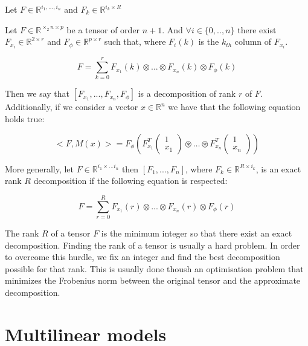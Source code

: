 \documentclass{article}
\begin{document}
Let $F \in \mathbb{R}^{i_1,\dots,i_n}$ and $F_k \in \mathbb{R}^{i_k \times R}$


Let $F \in \mathbb{R}^{\times_2 n \times p}$ be a tensor of order $n+1$.
And $\forall i \in \{0,..,n\} $ there exist $F_{x_i} \in \mathbb{R}^{2 \times r}$
and $F_\phi  \in \mathbb{R}^{p \times r}$ such that, where $F_{i}(k)$ is the $k_{th}$
column of $F_{x_i}$. 

\begin{equation}
    F = \sum_{k = 0}^r F_{x_1}(k) \otimes ... \otimes F_{x_n}(k) \otimes F_{\phi}(k) 
\end{equation}

Then we say that $[F_{x_1}, ..., F_{x_n}, F_\phi]$ is a decomposition of rank $r$ 
of $F$. Additionally, if we consider a vector $x \in \mathbb{R}^n$ we have that 
the following equation holds true:

\begin{equation}
    <F, M(x)> = F_{\phi}(F_{x_1}^T 
    \begin{pmatrix}
        1 \\
        x_1    
    \end{pmatrix}
    \circledast
    \dots
    \circledast
    F_{x_n}^T
    \begin{pmatrix}
        1 \\
        x_n    
    \end{pmatrix})
\end{equation}

More generally, let $F \in \mathbb{R}^{i_1 \times ... i_n}$
then $[F_1, ..., F_n]$, where $F_k \in \mathbb{R}^{R \times i_k}$, 
is an exact rank $R$ decomposition if the following equation is respected:

\begin{equation}
        F = \sum_{r = 0}^R F_{x_1}(r) \otimes ... \otimes F_{x_n}(r) \otimes F_{\phi}(r) 
\end{equation}

The rank $R$ of a tensor $F$ is the minimum integer so that there exist an 
exact decomposition. Finding the rank of a tensor is usually a hard problem.
In order to overcome this hurdle, we fix an integer and find the best decomposition
possible for that rank. This is usually done thoush an optimisation problem that
minimizes the Frobenius norm between the original tensor and the approximate decomposition.


\section{Multilinear models}
\end{document}
